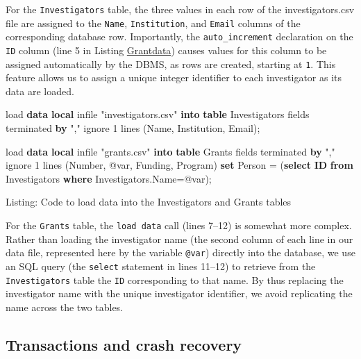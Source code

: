 \documentclass[]{krantz}
\newenvironment{Shaded}{\begin{snugshade}}{\end{snugshade}}
\newcommand{\KeywordTok}[1]{\textcolor[rgb]{0.13,0.29,0.53}{\textbf{#1}}}
\newcommand{\DataTypeTok}[1]{\textcolor[rgb]{0.13,0.29,0.53}{#1}}
\newcommand{\DecValTok}[1]{\textcolor[rgb]{0.00,0.00,0.81}{#1}}
\newcommand{\OtherTok}[1]{\textcolor[rgb]{0.56,0.35,0.01}{#1}}
\newcommand{\NormalTok}[1]{#1}
\begin{document}
For the \texttt{Investigators} table, the three values in each row of
the investigators.csv file are assigned to the \texttt{Name},
\texttt{Institution}, and \texttt{Email} columns of the corresponding
database row. Importantly, the \texttt{auto\_increment} declaration on
the \texttt{ID} column (line 5 in Listing
\protect\hyperlink{list:db1}{Grantdata}) causes values for this column
to be assigned automatically by the DBMS, as rows are created, starting
at \texttt{1}. This feature allows us to assign a unique integer
identifier to each investigator as its data are loaded.

\begin{Shaded}
\begin{Highlighting}[]
\NormalTok{load }\KeywordTok{data} \KeywordTok{local}\NormalTok{ infile }\OtherTok{"investigators.csv"}
    \KeywordTok{into} \KeywordTok{table}\NormalTok{ Investigators}
\NormalTok{    fields terminated }\KeywordTok{by} \OtherTok{","}
\NormalTok{    ignore }\DecValTok{1}\NormalTok{ lines}
\NormalTok{    (Name, Institution, Email);}

\NormalTok{load }\KeywordTok{data} \KeywordTok{local}\NormalTok{ infile }\OtherTok{"grants.csv"} \KeywordTok{into} \KeywordTok{table}\NormalTok{ Grants}
\NormalTok{    fields terminated }\KeywordTok{by} \OtherTok{","}
\NormalTok{    ignore }\DecValTok{1}\NormalTok{ lines}
\NormalTok{    (}\DataTypeTok{Number}\NormalTok{, @var, Funding, Program)}
\KeywordTok{set}\NormalTok{ Person = (}\KeywordTok{select} \KeywordTok{ID} \KeywordTok{from}\NormalTok{ Investigators}
              \KeywordTok{where}\NormalTok{ Investigators.Name=@var);}
\end{Highlighting}
\end{Shaded}

Listing: Code to load data into the Investigators and Grants tables

For the \texttt{Grants} table, the \texttt{load\ data} call (lines
7--12) is somewhat more complex. Rather than loading the investigator
name (the second column of each line in our data file, represented here
by the variable \texttt{@var}) directly into the database, we use an SQL
query (the \texttt{select} statement in lines 11--12) to retrieve from
the \texttt{Investigators} table the \texttt{ID} corresponding to that
name. By thus replacing the investigator name with the unique
investigator identifier, we avoid replicating the name across the two
tables.

\subsection{Transactions and crash
recovery}\label{transactions-and-crash-recovery}
\end{document}
